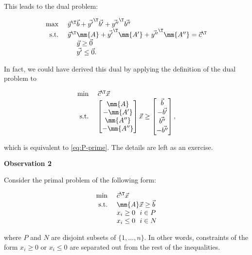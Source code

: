 This leads to the dual problem:

\begin{equation}
\begin{array}{rl}
\max~ & \vec{y}^\T\vec{b} 
+\vec{y'}^\T\vec{b'}
+\vec{y''}^\T\vec{b''} \\
\mbox{s.t.} ~
& \vec{y}^\T\mm{A}
+\vec{y'}^\T\mm{A'}
+\vec{y''}^\T\mm{A''} = \vec{c}^\T \\
&~~~~\vec{y} \geq \vec{0} \\
&~~~~\vec{y'} \leq \vec{0}.
\end{array} \label{eq:D-prime}
\end{equation}

In fact, we could have derived this dual by applying the definition of
the dual problem to

\begin{equation*}
\begin{array}{rl}
\min ~& \vec{c}^\T\vec{x} \\
\mbox{s.t.}  ~
& \begin{bmatrix} 
 \mm{A} \\
 -\mm{A'} \\
 \mm{A''} \\
 -\mm{A''}
\end{bmatrix} \vec{x}
\geq
\begin{bmatrix}
\vec{b} \\
-\vec{b'} \\
\vec{b''} \\
-\vec{b''}
\end{bmatrix},
\end{array}
\end{equation*}

which is equivalent to \eqref{eq:P-prime}. The details are left as an
exercise.

\textbf{Observation 2}

Consider the primal problem of the following form:

\begin{equation}
\begin{array}{rl}
\min ~& \vec{c}^\T\vec{x} \\
\mbox{s.t.} ~& \mm{A}\vec{x} \geq \vec{b} \\
 & x_i \geq 0 ~~i \in P \\
 & x_i \leq 0 ~~i \in N 
\end{array}\label{eq:P-dbl-prime}
\end{equation}

where \(P\) and \(N\) are disjoint subsets of \(\{1,\ldots,n\}\). In
other words, constraints of the form \(x_i \geq 0\) or \(x_i \leq 0\)
are separated out from the rest of the inequalities.

